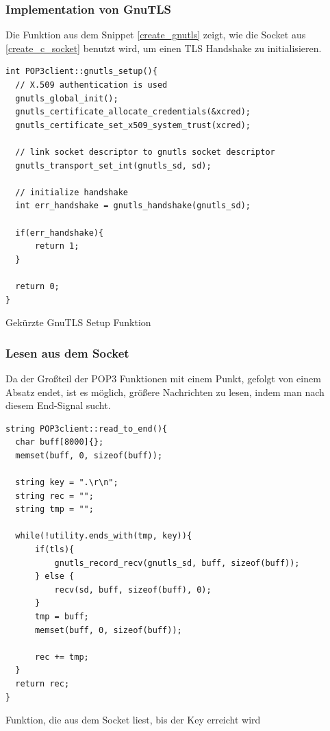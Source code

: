 \documentclass[12pt, letterpaper]{article}
\newenvironment{code}{\captionsetup{type=listing}}{}
\begin{document}
\subsubsection{Implementation von GnuTLS}
\label{gnutls_implement_proj}
Die Funktion aus dem Snippet \ref{create_gnutls} zeigt, wie die Socket aus \ref{create_c_socket} benutzt wird, um einen TLS Handshake zu initialisieren.

\begin{code}
\begin{verbatim}
int POP3client::gnutls_setup(){
  // X.509 authentication is used
  gnutls_global_init();
  gnutls_certificate_allocate_credentials(&xcred);
  gnutls_certificate_set_x509_system_trust(xcred);

  // link socket descriptor to gnutls socket descriptor
  gnutls_transport_set_int(gnutls_sd, sd);

  // initialize handshake
  int err_handshake = gnutls_handshake(gnutls_sd);

  if(err_handshake){
      return 1;
  }

  return 0;
}
\end{verbatim}
\caption{Gekürzte GnuTLS Setup Funktion}
\label{create_gnutls}
\end{code}

\subsubsection{Lesen aus dem Socket}

Da der Großteil der POP3 Funktionen mit einem Punkt, gefolgt von einem Absatz endet, ist es möglich, größere Nachrichten zu lesen, indem man nach diesem End-Signal sucht.

\begin{code}
\begin{verbatim}
string POP3client::read_to_end(){
  char buff[8000]{};
  memset(buff, 0, sizeof(buff));

  string key = ".\r\n";
  string rec = "";
  string tmp = "";

  while(!utility.ends_with(tmp, key)){
      if(tls){
          gnutls_record_recv(gnutls_sd, buff, sizeof(buff));
      } else {
          recv(sd, buff, sizeof(buff), 0);
      }
      tmp = buff;
      memset(buff, 0, sizeof(buff));

      rec += tmp;
  }
  return rec;
}
\end{verbatim}
\caption{Funktion, die aus dem Socket liest, bis der Key erreicht wird}
\label{read_to_end}
\end{code}
\end{document}
